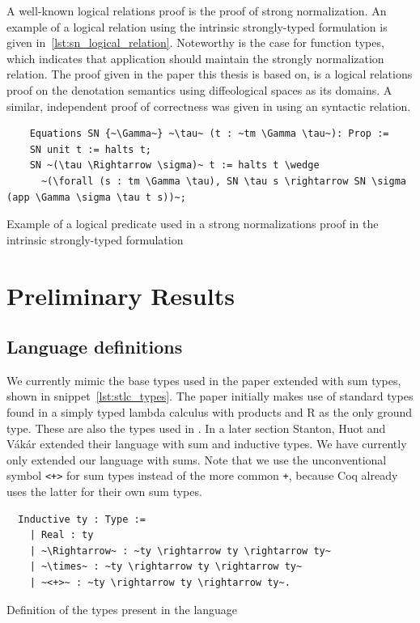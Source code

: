 \documentclass[12pt, final]{article}
\def\Vakar{V\'{a}k\'{a}r}
\begin{document}
A well-known logical relations proof is the proof of strong normalization.
An example of a logical relation using the intrinsic strongly-typed formulation is given in~\ref{lst:sn_logical_relation}.
Noteworthy is the case for function types, which indicates that application should maintain the strongly normalization relation.
The proof given in the paper this thesis is based on, is a logical relations proof on the denotation semantics using diffeological spaces as its domains\cite{huot2020correctness}.
A similar, independent proof of correctness was given in \cite{barthe2020versatility} using an syntactic relation.

\begin{listing}
  \begin{verbatim}
    Equations SN {~\Gamma~} ~\tau~ (t : ~tm \Gamma \tau~): Prop :=
    SN unit t := halts t;
    SN ~(\tau \Rightarrow \sigma)~ t := halts t \wedge
      ~(\forall (s : tm \Gamma \tau), SN \tau s \rightarrow SN \sigma (app \Gamma \sigma \tau t s))~;
  \end{verbatim}
  \caption{Example of a logical predicate used in a strong normalizations proof in the intrinsic strongly-typed formulation}
  \label{lst:sn_logical_relation}
\end{listing}

\section{Preliminary Results}

\subsection{Language definitions}

We currently mimic the base types used in the paper\cite{huot2020correctness} extended with sum types, shown in snippet~\ref{lst:stlc_types}. The paper initially makes use of standard types found in a simply typed lambda calculus with products and R as the only ground type. These are also the types used in \cite{barthe2020versatility}. In a later section Stanton, Huot and \Vakar{} extended their language with sum and inductive types. We have currently only extended our language with sums. Note that we use the unconventional symbol \texttt{<+>} for sum types instead of the more common \texttt{+}, because Coq already uses the latter for their own sum types.

\begin{listing}
  \begin{verbatim}
  Inductive ty : Type :=
    | Real : ty
    | ~\Rightarrow~ : ~ty \rightarrow ty \rightarrow ty~
    | ~\times~ : ~ty \rightarrow ty \rightarrow ty~
    | ~<+>~ : ~ty \rightarrow ty \rightarrow ty~.
  \end{verbatim}
  \caption{Definition of the types present in the language}
  \label{lst:stlc_types}
\end{listing}
\end{document}
